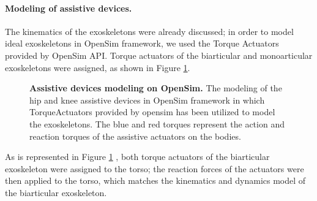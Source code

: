 \documentclass[10pt,letterpaper]{article}
\begin{document}
\paragraph{Modeling of assistive devices.}The kinematics of the exoskeletons were already discussed; in order to model ideal exoskeletons in OpenSim framework, we used the Torque Actuators provided by OpenSim API\cite{103}. Torque actuators of the biarticular and monoarticular exoskeletons were assigned, as shown in Figure \ref{Fig_Exos_Model_Opensim}.
\begin{figure}[h!]
	\centering
	\hfil
	\vspace{1mm}
	\caption{\small{\textbf{Assistive devices modeling on OpenSim.} The modeling of the hip and knee assistive devices in OpenSim framework in which TorqueActuators provided by opensim has been utilized to model the exoskeletons. The blue and red torques represent the action and reaction torques of the assistive actuators on the bodies.}}
	\label{Fig_Exos_Model_Opensim}
\end{figure}
As is represented in Figure \ref{Fig_Exos_Model_Opensim} , both torque actuators of the biarticular exoskeleton were assigned to the torso; the reaction forces of the actuators were then applied to the torso, which matches the kinematics and dynamics model of the biarticular exoskeleton.
\end{document}
